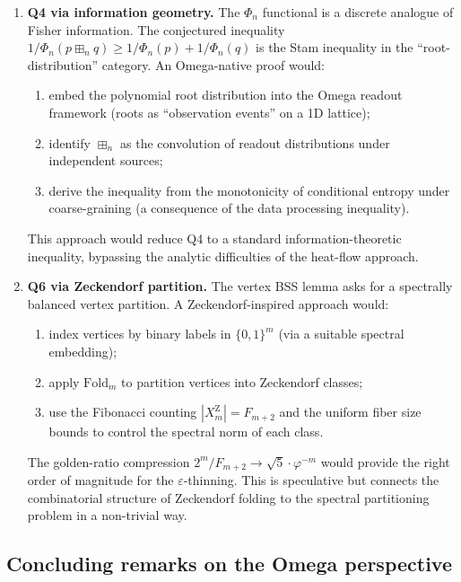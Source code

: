 \begin{enumerate}
\item \textbf{Q4 via information geometry.}
  The $\Phi_n$ functional is a discrete analogue of Fisher information.
  The conjectured inequality $1/\Phi_n(p\boxplus_n q)\ge 1/\Phi_n(p)+1/\Phi_n(q)$
  is the Stam inequality in the ``root-distribution'' category.
  An Omega-native proof would:
  \begin{enumerate}[nosep,label=(\alph*)]
  \item embed the polynomial root distribution into the Omega readout
    framework (roots as ``observation events'' on a 1D lattice);
  \item identify $\boxplus_n$ as the convolution of readout distributions
    under independent sources;
  \item derive the inequality from the monotonicity of conditional entropy
    under coarse-graining (a consequence of the data processing inequality).
  \end{enumerate}
  This approach would reduce Q4 to a standard information-theoretic
  inequality, bypassing the analytic difficulties of the heat-flow approach.

\item \textbf{Q6 via Zeckendorf partition.}
  The vertex BSS lemma asks for a spectrally balanced vertex partition.
  A Zeckendorf-inspired approach would:
  \begin{enumerate}[nosep,label=(\alph*)]
  \item index vertices by binary labels in $\{0,1\}^m$ (via a suitable
    spectral embedding);
  \item apply $\mathrm{Fold}_m$ to partition vertices into Zeckendorf classes;
  \item use the Fibonacci counting $|X^{\mathrm Z}_m|=F_{m+2}$ and the
    uniform fiber size bounds to control the spectral norm of each class.
  \end{enumerate}
  The golden-ratio compression $2^m/F_{m+2}\to\sqrt5\cdot\varphi^{-m}$
  would provide the right order of magnitude for the $\varepsilon$-thinning.
  This is speculative but connects the combinatorial structure of Zeckendorf
  folding to the spectral partitioning problem in a non-trivial way.
\end{enumerate}

\subsection{Concluding remarks on the Omega perspective}


